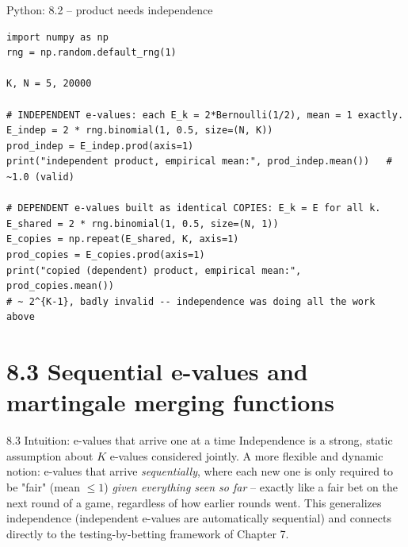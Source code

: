 \documentclass[aspectratio=169,10pt]{beamer}
\begin{document}
\begin{frame}[fragile]{Python: 8.2 -- product needs independence}
  \begin{lstlisting}
import numpy as np
rng = np.random.default_rng(1)

K, N = 5, 20000

# INDEPENDENT e-values: each E_k = 2*Bernoulli(1/2), mean = 1 exactly.
E_indep = 2 * rng.binomial(1, 0.5, size=(N, K))
prod_indep = E_indep.prod(axis=1)
print("independent product, empirical mean:", prod_indep.mean())   # ~1.0 (valid)

# DEPENDENT e-values built as identical COPIES: E_k = E for all k.
E_shared = 2 * rng.binomial(1, 0.5, size=(N, 1))
E_copies = np.repeat(E_shared, K, axis=1)
prod_copies = E_copies.prod(axis=1)
print("copied (dependent) product, empirical mean:", prod_copies.mean())
# ~ 2^{K-1}, badly invalid -- independence was doing all the work above
  \end{lstlisting}
\end{frame}

\section{8.3 Sequential e-values and martingale merging functions}

\begin{frame}{8.3 Intuition: e-values that arrive one at a time}
  Independence is a strong, static assumption about $K$ e-values considered jointly. A more flexible and dynamic notion: e-values that arrive \emph{sequentially}, where each new one is only required to be "fair" (mean $\leq 1$) \emph{given everything seen so far} -- exactly like a fair bet on the next round of a game, regardless of how earlier rounds went. This generalizes independence (independent e-values are automatically sequential) and connects directly to the testing-by-betting framework of Chapter 7.
\end{frame}
\end{document}
